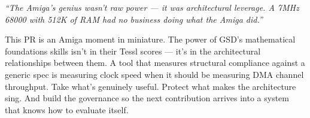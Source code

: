 \documentclass[11pt,letterpaper]{article}
\begin{document}
\begin{quotebox}
\emph{``The Amiga's genius wasn't raw power --- it was architectural leverage. A 7MHz 68000 with 512K of RAM had no business doing what the Amiga did.''}

This PR is an Amiga moment in miniature. The power of GSD's mathematical foundations skills isn't in their Tessl scores --- it's in the architectural relationships between them. A tool that measures structural compliance against a generic spec is measuring clock speed when it should be measuring DMA channel throughput. Take what's genuinely useful. Protect what makes the architecture sing. And build the governance so the next contribution arrives into a system that knows how to evaluate itself.
\end{quotebox}
\end{document}
